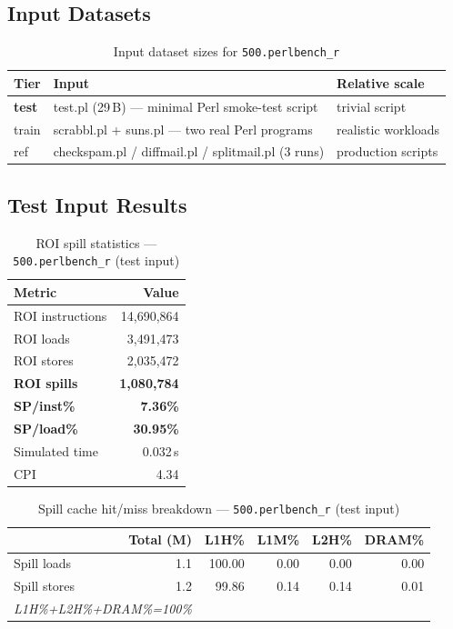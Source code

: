 \documentclass[11pt,a4paper]{article}
\begin{document}
\subsection{Input Datasets}

\begin{table}[H]
\centering
\caption{Input dataset sizes for \texttt{500.perlbench\_r}}
\label{tab:perlbench_inputs}
\small
\begin{tabular}{lp{8cm}l}
\toprule
\textbf{Tier} & \textbf{Input} & \textbf{Relative scale} \\
\midrule
\textbf{test} & test.pl (29\,B) --- minimal Perl smoke-test script & trivial script \\
train & scrabbl.pl + suns.pl --- two real Perl programs & realistic workloads \\
ref & checkspam.pl / diffmail.pl / splitmail.pl (3 runs) & production scripts \\
\bottomrule
\end{tabular}
\end{table}

\subsection{Test Input Results}

\begin{table}[H]
\centering
\caption{ROI spill statistics --- \texttt{500.perlbench\_r} (test input)}
\label{tab:perlbench_test_roi}
\begin{tabular}{lr}
\toprule
\textbf{Metric} & \textbf{Value} \\
\midrule
ROI instructions & 14,690,864 \\
ROI loads        & 3,491,473 \\
ROI stores       & 2,035,472 \\
\textbf{ROI spills}   & \textbf{1,080,784} \\
\textbf{SP/inst\%}   & \textbf{7.36\%} \\
\textbf{SP/load\%}   & \textbf{30.95\%} \\
Simulated time   & 0.032\,s \\
CPI              & 4.34 \\
\bottomrule
\end{tabular}
\end{table}

\begin{table}[H]
\centering
\caption{Spill cache hit/miss breakdown --- \texttt{500.perlbench\_r} (test input)}
\label{tab:perlbench_test_cache}
\begin{tabular}{lrrrrr}
\toprule
\textbf{} & \textbf{Total (M)} & \textbf{L1H\%} & \textbf{L1M\%} & \textbf{L2H\%} & \textbf{DRAM\%} \\
\midrule
Spill loads  & 1.1 & 100.00 & 0.00 & 0.00 & 0.00 \\
Spill stores & 1.2 & 99.86 & 0.14 & 0.14 & 0.01 \\
\multicolumn{2}{l}{\small\textit{L1H\%+L2H\%+DRAM\%=100\%}} \\
\bottomrule
\end{tabular}
\end{table}
\end{document}
